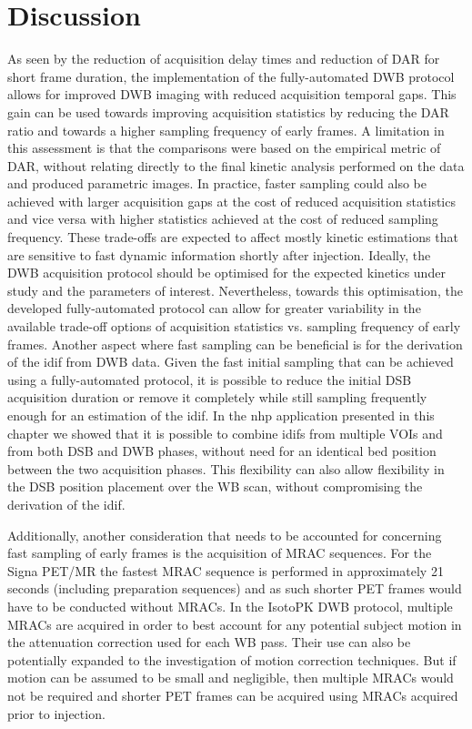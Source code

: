 \section{Discussion}

As seen by the reduction of acquisition delay times and reduction of DAR for short frame duration, the implementation of the fully-automated DWB protocol allows for improved DWB imaging with reduced acquisition temporal gaps.
%
This gain can be used towards improving acquisition statistics by reducing the DAR ratio and towards a higher sampling frequency of early frames. 
A limitation in this assessment is that the comparisons were based on the empirical metric of DAR, without relating directly to the final kinetic analysis performed on the data and produced parametric images. In practice, faster sampling could also be achieved with larger acquisition gaps at the cost of reduced acquisition statistics and vice versa with higher statistics achieved at the cost of reduced sampling frequency. 
These trade-offs are expected to affect mostly kinetic estimations that are sensitive to fast dynamic information shortly after injection. 
Ideally, the DWB acquisition protocol should be optimised for the expected kinetics under study and the parameters of interest. Nevertheless, towards this optimisation, the developed fully-automated protocol can allow for greater variability in the available trade-off options of acquisition statistics vs. sampling frequency of early frames. 
Another aspect where fast sampling can be beneficial is for the derivation of the \gls{idif} from DWB data. Given the fast initial sampling that can be achieved using a fully-automated protocol, it is possible to reduce the initial DSB acquisition duration or remove it completely while still sampling frequently enough for an estimation of the \gls{idif}.
In the \gls{nhp} application presented in this chapter we showed that it is possible to combine \glspl{idif} from multiple VOIs and from both DSB and DWB phases, without need for an identical bed position between the two acquisition phases. This flexibility can also allow flexibility in the DSB position placement over the WB scan, without compromising the derivation of the \gls{idif}. 

Additionally, another consideration that needs to be accounted for concerning fast sampling of early frames is the acquisition of MRAC sequences. For the Signa PET/MR the fastest MRAC sequence is performed in approximately 21 seconds (including preparation sequences) and as such shorter PET frames would have to be conducted without MRACs. In the IsotoPK DWB protocol, multiple MRACs are acquired in order to best account for any potential subject motion in the attenuation correction used for each WB pass. Their use can also be potentially expanded to the investigation of motion correction techniques. But if motion can be assumed to be small and negligible, then multiple MRACs would not be required and shorter PET frames can be acquired using MRACs acquired prior to injection. 

